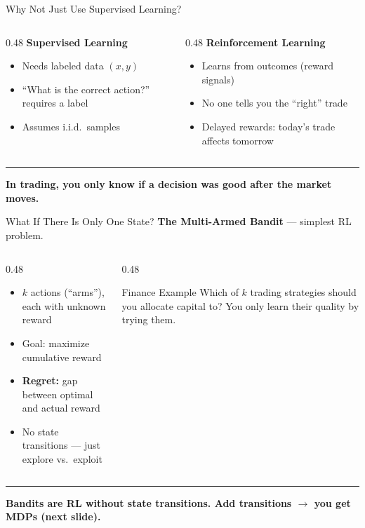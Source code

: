 \documentclass[8pt,aspectratio=169]{beamer}
\newcommand{\bottomnote}[1]{%
\vfill
\vspace{-2mm}
\textcolor{mllavender2}{\rule{\textwidth}{0.4pt}}
\vspace{1mm}
\footnotesize
\textbf{#1}
}
\newenvironment{compactlist}{%
  \begin{itemize}%
    \setlength{\itemsep}{2pt}%
    \setlength{\parskip}{0pt}%
    \setlength{\parsep}{0pt}%
}{%
  \end{itemize}%
}
\begin{document}
\begin{frame}{Why Not Just Use Supervised Learning?}
\begin{columns}[T]
\begin{column}{0.48\textwidth}
\textbf{Supervised Learning}
\begin{compactlist}
  \item Needs labeled data $(x, y)$
  \item ``What is the correct action?'' requires a label
  \item Assumes i.i.d.\ samples
\end{compactlist}
\end{column}
\begin{column}{0.48\textwidth}
\textbf{Reinforcement Learning}
\begin{compactlist}
  \item Learns from outcomes (reward signals)
  \item No one tells you the ``right'' trade
  \item Delayed rewards: today's trade affects tomorrow
\end{compactlist}
\end{column}
\end{columns}

\bottomnote{In trading, you only know if a decision was good after the market moves.}
\end{frame}


\begin{frame}{What If There Is Only One State?}
\textbf{The Multi-Armed Bandit} --- simplest RL problem.

\begin{columns}[T]
\begin{column}{0.48\textwidth}
\begin{compactlist}
  \item $k$ actions (``arms''), each with unknown reward
  \item Goal: maximize cumulative reward
  \item \textbf{Regret:} gap between optimal and actual reward
  \item No state transitions --- just explore vs.\ exploit
\end{compactlist}
\end{column}
\begin{column}{0.48\textwidth}
\begin{block}{Finance Example}
Which of $k$ trading strategies should you allocate capital to? You only learn their quality by trying them.
\end{block}
\end{column}
\end{columns}

\bottomnote{Bandits are RL without state transitions. Add transitions $\rightarrow$ you get MDPs (next slide).}
\end{frame}
\end{document}
